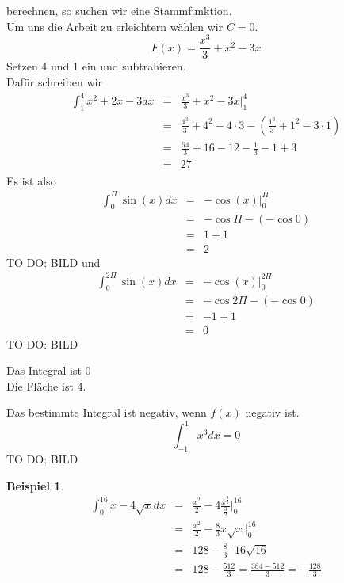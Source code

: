 \documentclass{report}
\newtheorem{myexample}{Beispiel}
\begin{document}
berechnen, so suchen wir eine Stammfunktion.\\
Um uns die Arbeit zu erleichtern wählen wir $C=0$.
\begin{equation*}
	F(x) = \frac{x^3}{3}+x^2-3x
\end{equation*}
Setzen 4 und 1 ein und subtrahieren.\\
Dafür schreiben wir
\begin{eqnarray*}
	\int_1^4 x^2+2x-3dx &=& \frac{x^3}{3}+x^2-3x \Big|_1^4\\
	&=& \frac{4^3}{3}+4^2-4\cdot 3 -(\frac{1^3}{3}+1^2-3\cdot 1)\\
	&=& \frac{64}{3} + 16 -12 - \frac{1}{3} -1 + 3\\
	&=& \underline{27}
\end{eqnarray*}
Es ist also
\begin{eqnarray*}
	\int_0^\Pi \sin(x)dx &=& -\cos(x) \Big|_0^\Pi\\
	&=& -\cos\Pi-(-\cos0)\\
	&=& 1 + 1\\	
	&=& 2
\end{eqnarray*}
TO DO: BILD
und 
\begin{eqnarray*}
	\int_0^{2\Pi} \sin(x)dx &=& -\cos(x) \Big|_0^{2\Pi}\\
	&=& -\cos2\Pi-(-\cos0)\\
	&=& -1 + 1\\	
	&=& 0
\end{eqnarray*}
TO DO: BILD
\begin{center}
	Das Integral ist 0\\
	Die Fläche ist 4.
\end{center}
Das bestimmte Integral ist negativ, wenn $f(x)$ negativ ist.
\begin{equation*}\int_{-1}^1 x^3dx = 0\end{equation*}
TO DO: BILD
\begin{myexample}
	\begin{eqnarray*}
		\int_0^{16} x-4\sqrt{x}dx &=& \frac{x^2}{2}-4\frac{x^{\frac{3}{2}}}{\frac{3}{2}}\Big|_0^{16}\\
		&=& \frac{x^2}{2} - \frac{8}{3}x \sqrt{x} \Big|_0^{16}\\
		&=& 128 - \frac{8}{3} \cdot 16 \sqrt{16}\\
		&=& 128 - \frac{512}{3} = \frac{384-512}{3} = - \frac{128}{3}
	\end{eqnarray*}
\end{myexample}
\newpage
\end{document}
